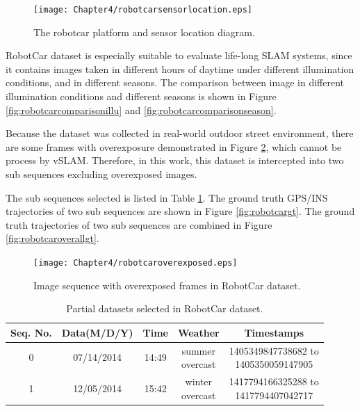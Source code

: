 \begin{figure}[H]
	\centering
	\texttt{[image: Chapter4/robotcarsensorlocation.eps]}
	\caption{The robotcar platform and sensor location diagram.}
	\label{fig:robotcarsensorlocation} 
\end{figure}

RobotCar dataset is especially suitable to evaluate life-long SLAM systems, since it contains images taken in different hours of daytime under different illumination conditions, and in different seasons. The comparison between image in different illumination conditions and different seasons is shown in Figure \ref{fig:robotcarcomparisonillu} and \ref{fig:robotcarcomparisonseason}.

Because the dataset was collected in real-world outdoor street environment, there are some frames with overexposure demonstrated in Figure \ref{fig:robotcaroverexposed}, which cannot be process by vSLAM. Therefore, in this work, this dataset is intercepted into two sub sequences excluding overexposed images.

The sub sequences selected is listed in Table \ref{tbl:robotcarpartial}. The ground truth GPS/INS trajectories of two sub sequences are shown in Figure \ref{fig:robotcargt}. The ground truth trajectories of two sub sequences are combined in Figure \ref{fig:robotcaroverallgt}.

\begin{figure}[H]
	\centering
	\texttt{[image: Chapter4/robotcaroverexposed.eps]}
	\caption{Image sequence with overexposed frames in RobotCar dataset.}
	\label{fig:robotcaroverexposed} 
\end{figure}

\begin{table}
	\centering
	\caption{Partial datasets selected in RobotCar dataset.}
	\begin{tabular}{|c|c|c|c|c|}
		\hline
		Seq. No. & Data(M/D/Y) & Time & Weather & Timestamps  \\
		\hline
		0&07/14/2014&14:49&\tabincell{c}{summer\\overcast}& \tabincell{c}{1405349847738682 to\\1405350059147905}\\
		\hline
		1&12/05/2014&15:42&\tabincell{c}{winter\\overcast}& \tabincell{c}{1417794166325288 to\\1417794407042717}\\
		\hline
	\end{tabular}
	\label{tbl:robotcarpartial}
\end{table}

